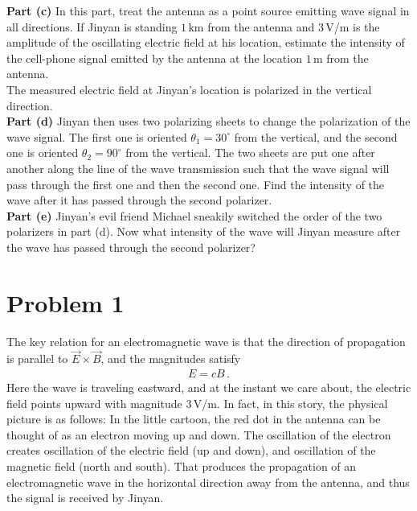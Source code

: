 \documentclass[11pt]{article}
\begin{document}
\noindent\textbf{Part (c)} In this part, treat the antenna as a point source emitting wave signal in all directions. If Jinyan is standing $1\,$km from the antenna and $3\,$V/m is the amplitude of the oscillating electric field at his location, estimate the intensity of the cell-phone signal emitted by the antenna at the location $1\,$m from the antenna.\\


\newpage
\noindent The measured electric field at Jinyan's location is polarized in the vertical direction.\\ 

\noindent\textbf{Part (d)} Jinyan then uses two polarizing sheets to change the polarization of the wave signal. The first one is oriented $\theta_1 = 30^\circ$ from the vertical, and the second one is oriented $\theta_2 = 90^\circ$ from the vertical. The two sheets are put one after another along the line of the wave transmission such that the wave signal will pass through the first one and then the second one. Find the intensity of the wave after it has passed through the second polarizer.\\

\noindent\textbf{Part (e)} Jinyan's evil friend Michael sneakily switched the order of the two polarizers in part (d). Now what intensity of the wave will Jinyan measure after the wave has passed through the second polarizer?

\newpage
\section*{Problem 1}
The key relation for an electromagnetic wave is that the direction of propagation is parallel to $\vec{E}\times \vec{B}$, and the magnitudes satisfy
\begin{align*}
E = cB\,.
\end{align*}
Here the wave is traveling eastward, and at the instant we care about, the electric field points upward with magnitude $3\,$V/m. In fact, in this story, the physical picture is as follows: In the little cartoon, the red dot in the antenna can be thought of as an electron moving up and down. The oscillation of the electron creates oscillation of the electric field (up and down), and oscillation of the magnetic field (north and south). That produces the propagation of an electromagnetic wave in the horizontal direction away from the antenna, and thus the signal is received by Jinyan.\\
\end{document}
